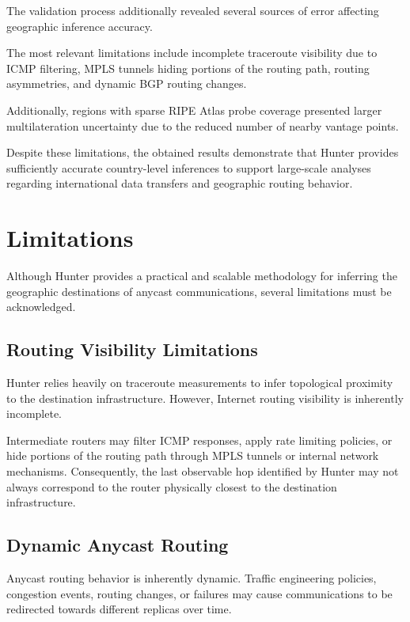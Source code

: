 The validation process additionally revealed several sources of error affecting geographic inference accuracy.

The most relevant limitations include incomplete traceroute visibility due to ICMP filtering, MPLS tunnels hiding portions of the routing path, routing asymmetries, and dynamic BGP routing changes.

Additionally, regions with sparse RIPE Atlas probe coverage presented larger multilateration uncertainty due to the reduced number of nearby vantage points.

Despite these limitations, the obtained results demonstrate that Hunter provides sufficiently accurate country-level inferences to support large-scale analyses regarding international data transfers and geographic routing behavior.

\section{Limitations}
\label{sc:hunter_limitations}

Although Hunter provides a practical and scalable methodology for inferring the geographic destinations of anycast communications, several limitations must be acknowledged.

\subsection{Routing Visibility Limitations}

Hunter relies heavily on traceroute measurements to infer topological proximity to the destination infrastructure. However, Internet routing visibility is inherently incomplete.

Intermediate routers may filter ICMP responses, apply rate limiting policies, or hide portions of the routing path through MPLS tunnels or internal network mechanisms. Consequently, the last observable hop identified by Hunter may not always correspond to the router physically closest to the destination infrastructure.

\subsection{Dynamic Anycast Routing}

Anycast routing behavior is inherently dynamic. Traffic engineering policies, congestion events, routing changes, or failures may cause communications to be redirected towards different replicas over time.


